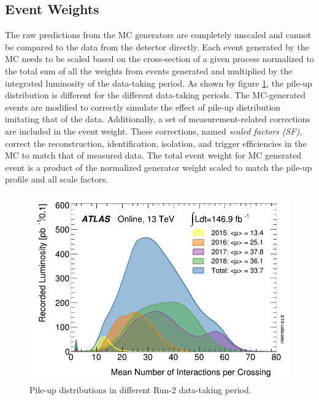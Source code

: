 \subsection{Event Weights}
\label{subsec:EventWt}

The raw predictions from the MC generators are completely unscaled and cannot be compared to the data from the detector directly. Each event generated by the MC needs to be scaled based on the cross-section of a given process normalized to the total sum of all the weights from events generated and multiplied by the integrated luminosity of the data-taking period. As shown by figure \ref{fig:PileupDiffRuns}, the pile-up distribution is different for the different data-taking periods. The MC-generated events are modified to correctly simulate the effect of pile-up distribution imitating that of the data. Additionally, a set of measurement-related corrections are included in the event weight. These corrections, named \textit{ scaled factors (SF)}, correct the reconstruction, identification, isolation, and trigger efficiencies in the MC to match that of measured data. The total event weight for MC generated event is a product of the normalized generator weight scaled to match the pile-up profile and all scale factors.

\begin{figure}
\centering
\includegraphics[width=.8\linewidth]{figures/AnalysisOverview/mu_ProfileRun2.pdf}
\caption{Pile-up distributions in different Run-2 data-taking period.\label{fig:PileupDiffRuns} \cite{ATLASRun2DataTaking}}
\end{figure}

